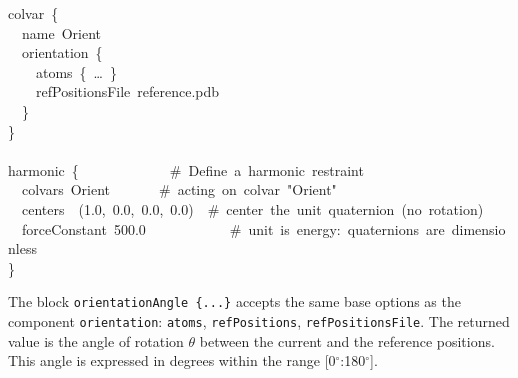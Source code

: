 \begin{cvexampleinput}
\-colvar~\{\\
\-~~name~Orient\\
\-~~orientation~\{\\
\-~~~~atoms~\{~\ldots~\}\\
\-~~~~refPositionsFile~reference.pdb\\
\-~~\}\\
\-\}\\
\-\\
\-harmonic~\{~~~~~~~~~~~~~\#~Define~a~harmonic~restraint\\
\-~~colvars~Orient~~~~~~~\#~acting~on~colvar~"Orient"\\
\-~~centers~~(1.0,~0.0,~0.0,~0.0)~~\#~center~the~unit~quaternion~(no~rotation)\\
\-~~forceConstant~500.0~~~~~~~~~~~~\#~unit~is~energy:~quaternions~are~dimensionless\\
\-\}\\
\end{cvexampleinput}



The block \texttt{orientationAngle~\{...\}} accepts the same base options as
the component \texttt{orientation}: \texttt{atoms}, \texttt{refPositions}, \texttt{refPositionsFile}.
The returned value is the angle of rotation $\theta$ between the current and the reference positions.
This angle is expressed in degrees within the range [0$^{\circ}$:180$^{\circ}$].

\begin{cvcoptions}
\item %
\item %
\item %

\end{cvcoptions}


